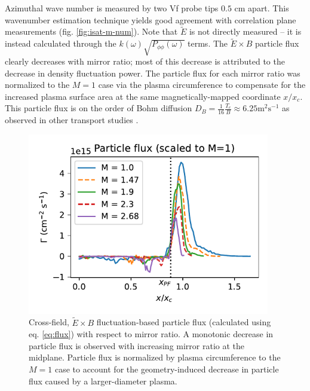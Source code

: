 Azimuthal wave number is measured by two Vf probe tips $0.5$ cm apart. This wavenumber estimation technique yields good agreement with correlation plane measurements (fig. \ref{fig:isat-m-num}). Note that $\tilde{E}$ is not directly measured -- it is instead calculated through the $k(\omega) \sqrt{P_{\phi \phi} (\omega)}$ terms.
The $\tilde{E} \times B$ particle flux clearly decreases with mirror ratio; most of this decrease is attributed to the decrease in density fluctuation power. The particle flux for each mirror ratio was normalized to the $M=1$ case via the plasma circumference to compensate for the increased plasma surface area at the same magnetically-mapped coordinate $x/x_c$. This particle flux is on the order of Bohm diffusion $D_B = \frac{1}{16} \frac{T_e}{B} \approx 6.25 \text{m}^{2} \text{s}^{-1}$ as observed in other transport studies \cite{Maggs-Carter_2008}.
\begin{figure}
    \centering
    \includegraphics[width=300pt]{figures/fig8.pdf}
    \caption[Cross-field, $\tilde{E} \times B$ particle flux]{Cross-field, $\tilde{E} \times B$ fluctuation-based particle flux (calculated using eq. \ref{eq:flux}) with respect to mirror ratio. A monotonic decrease in particle flux is observed with increasing mirror ratio at the midplane. Particle flux is normalized by plasma circumference to the $M=1$ case to account for the geometry-induced decrease in particle flux caused by a larger-diameter plasma.}
    \label{fig:particle-flux}
\end{figure}

